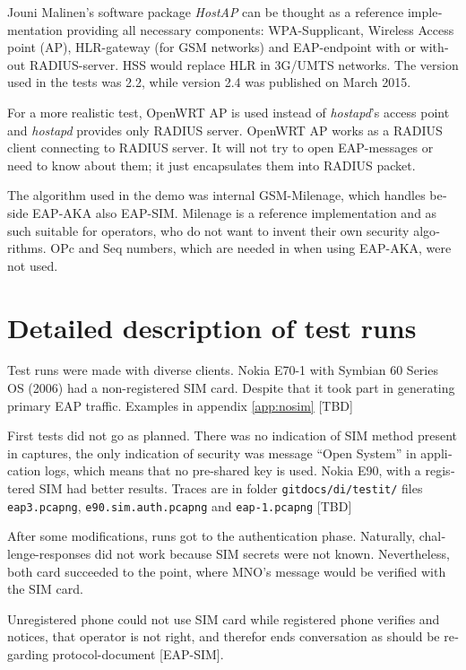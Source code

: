 \documentclass[12pt,a4paper,english]{tutthesis}
\begin{document}
\begin{otherlanguage}{english}
Jouni Malinen's software package \emph{HostAP}\cite{hostapd} can be thought
 as a reference
implementation providing all necessary components: WPA-Supplicant, Wireless
Access point (AP), HLR-gateway (for GSM networks) and EAP-endpoint with
or without RADIUS-server. HSS would replace HLR in 3G/UMTS networks.
The version used in the tests was 2.2, while version
2.4 was published on March 2015.

For a more realistic test, OpenWRT AP is used instead of \emph{hostapd}'s
access point and \emph{hostapd} provides only RADIUS server.
OpenWRT AP works as a RADIUS client connecting to RADIUS server. 
It will not try to open EAP-messages or need
to know about them; it just encapsulates them into RADIUS packet.

The algorithm used in the demo was internal GSM-Milenage,
which handles beside EAP-AKA also EAP-SIM.
Milenage is a reference implementation and as such suitable for operators, who do not 
want to invent their own security algorithms. OPc and Seq numbers,
which are needed in when using EAP-AKA, were not used.

\section{Detailed description of test runs}
\label{sec-5-2}






Test runs were made with diverse clients.
Nokia E70-1 with Symbian 60 Series OS (2006) had a
non-registered SIM card. Despite that it took part in generating
primary EAP traffic.
Examples in appendix \ref{app:nosim}   [TBD]

First tests 
did not go as planned. There was no indication of SIM method
present in captures, the only indication of security was message
``Open System'' in application logs, which means that no pre-shared
key is used.
Nokia E90, with a registered SIM had better results. Traces
are in folder \verb~gitdocs/di/testit/~ files \verb~eap3.pcapng~,
  \verb~e90.sim.auth.pcapng~ and \verb~eap-1.pcapng~  [TBD]

After some modifications, runs got to the authentication phase.
Naturally, challenge-responses did not work because SIM secrets were
not known. Nevertheless, both card succeeded to the point, where MNO's
message would be verified with the SIM card.

Unregistered phone could not use SIM card while 
registered phone verifies and notices, that operator is not right, 
and therefor ends conversation as should be regarding protocol-document [EAP-SIM].


\end{otherlanguage}
\end{document}
